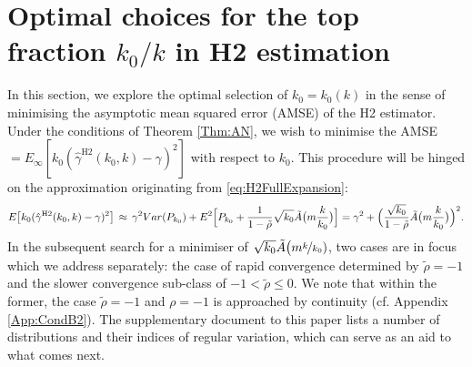 \documentclass[11pt, a4paper, oneside]{article}
\numberwithin{equation}{section}
\theoremstyle{plain}
\theoremstyle{definition}
\begin{document}
\section{Optimal choices for the top fraction $k_0/k$ in H2 estimation} \label{Sec:OptimalFraction}

In this section, we explore the optimal selection of $k_{0}=k_{0}(k)$ in the sense of minimising the asymptotic mean squared error (AMSE) of the H2 estimator. Under the conditions of Theorem \ref{Thm:AN}, we wish to minimise the AMSE$= E_{\infty}[k_0( \hat{\gamma}^{\textrm{H2}}(k_0,k)-\gamma)^2]$ with respect to $k_0$. This procedure will be hinged on the approximation originating from \eqref{eq:H2FullExpansion}:
 \begin{equation*}
              E\bigl[k_0( \hat{\gamma}^{\textrm{H2}}(k_0,k)-\gamma)^2\bigr]\, \approx \, \gamma^2 Var(P_{k_{0}}) + E^2\Bigl[P_{k_{0}}+ \frac{1}{1-\tilde{\rho}}\sqrt{k_0} \tilde{A}\bigl(m\frac{k}{k_0} \bigl)\Bigr] = \gamma^2 + \Bigl(\frac{\sqrt{k_0}}{1-\tilde{\rho}} \tilde{A}\bigl(m\frac{k}{k_0} \bigl)\Bigr)^2.
 \end{equation*}
In the subsequent search for a minimiser of $\sqrt{k_0} \tilde{A}\bigl(m\nicefrac{k}{k_0})$,
two cases are in focus which we address separately: the case of rapid convergence determined by $\tilde{\rho}= -1$ and the slower convergence sub-class of $-1< \tilde{\rho} \leq 0$. We note that within the former, the case $\tilde{\rho}=-1$ and $\rho =-1$ is approached by continuity (cf. Appendix \ref{App:CondB2}). The supplementary document to this paper lists a number of distributions and their indices of regular variation, which can serve as an aid to what comes next.
\end{document}
